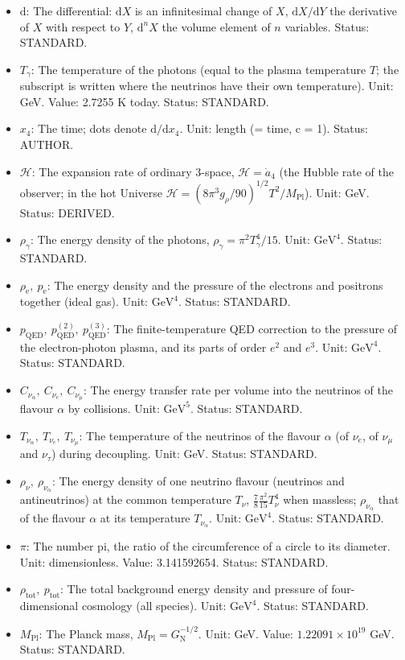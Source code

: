\documentclass[
  10pt,
]{article}
\providecommand{\tightlist}{%
  \setlength{\itemsep}{0pt}\setlength{\parskip}{0pt}}
\begin{document}
\begin{itemize}
\tightlist
\item
  \(\mathrm{d}\): The differential: \(\mathrm{d}X\) is an infinitesimal
  change of \(X\), \(\mathrm{d}X/\mathrm{d}Y\) the derivative of \(X\)
  with respect to \(Y\), \(\mathrm{d}^nX\) the volume element of \(n\)
  variables. Status: STANDARD.
\item
  \(T_\gamma\): The temperature of the photons (equal to the plasma
  temperature \(T\); the subscript is written where the neutrinos have
  their own temperature). Unit: GeV. Value: 2.7255 K today. Status:
  STANDARD.
\item
  \(x_4\): The time; dots denote \(\mathrm{d}/\mathrm{d}x_4\). Unit:
  length (= time, c = 1). Status: AUTHOR.
\item
  \(\mathcal{H}\): The expansion rate of ordinary 3-space,
  \(\mathcal{H} = \dot a_4\) (the Hubble rate of the observer; in the
  hot Universe
  \(\mathcal{H} = (8\pi^3g_\rho/90)^{1/2}T^2/M_{\mathrm{Pl}}\)). Unit:
  GeV. Status: DERIVED.
\item
  \(\rho_\gamma\): The energy density of the photons,
  \(\rho_\gamma = \pi^2T_\gamma^4/15\). Unit: \(\mathrm{GeV}^{4}\).
  Status: STANDARD.
\item
  \(\rho_{\mathrm{e}},\ p_{\mathrm{e}}\): The energy density and the
  pressure of the electrons and positrons together (ideal gas). Unit:
  \(\mathrm{GeV}^{4}\). Status: STANDARD.
\item
  \(p_{\mathrm{QED}},\ p_{\mathrm{QED}}^{(2)},\ p_{\mathrm{QED}}^{(3)}\):
  The finite-temperature QED correction to the pressure of the
  electron-photon plasma, and its parts of order \(e^2\) and \(e^3\).
  Unit: \(\mathrm{GeV}^{4}\). Status: STANDARD.
\item
  \(C_{\nu_\alpha},\ C_{\nu_e},\ C_{\nu_\mu}\): The energy transfer rate
  per volume into the neutrinos of the flavour \(\alpha\) by collisions.
  Unit: \(\mathrm{GeV}^{5}\). Status: STANDARD.
\item
  \(T_{\nu_\alpha},\ T_{\nu_e},\ T_{\nu_\mu}\): The temperature of the
  neutrinos of the flavour \(\alpha\) (of \(\nu_e\), of \(\nu_\mu\) and
  \(\nu_\tau\)) during decoupling. Unit: GeV. Status: STANDARD.
\item
  \(\rho_\nu,\ \rho_{\nu_\alpha}\): The energy density of one neutrino
  flavour (neutrinos and antineutrinos) at the common temperature
  \(T_\nu\), \(\frac78\frac{\pi^2}{15}T_\nu^4\) when massless;
  \(\rho_{\nu_\alpha}\) that of the flavour \(\alpha\) at its
  temperature \(T_{\nu_\alpha}\). Unit: \(\mathrm{GeV}^{4}\). Status:
  STANDARD.
\item
  \(\pi\): The number pi, the ratio of the circumference of a circle to
  its diameter. Unit: dimensionless. Value: 3.141592654. Status:
  STANDARD.
\item
  \(\rho_{\mathrm{tot}},\ p_{\mathrm{tot}}\): The total background
  energy density and pressure of four-dimensional cosmology (all
  species). Unit: \(\mathrm{GeV}^{4}\). Status: STANDARD.
\item
  \(M_{\mathrm{Pl}}\): The Planck mass,
  \(M_{\mathrm{Pl}} = G_{\mathrm{N}}^{-1/2}\). Unit: GeV. Value:
  \(1.22091\times10^{19}\) GeV. Status: STANDARD.
\end{itemize}
\end{document}
